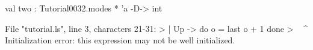 \runverbatimfalse
{}
\begin{RunVerbatimMsg}
val two : Tutorial0032.modes * 'a -D-> int
\end{RunVerbatimMsg}
\begin{RunVerbatimErr}
File "tutorial.ls", line 3, characters 21-31:
>      | Up -> do o = last o + 1 done
>                     ^^^^^^^^^^
Initialization error: this expression may not be well initialized.
\end{RunVerbatimErr}
